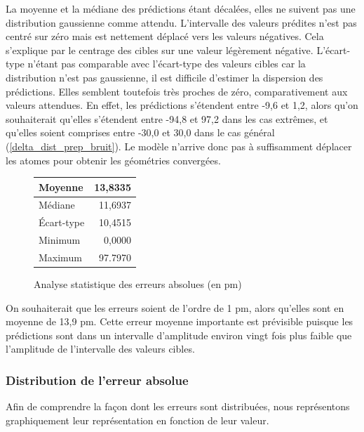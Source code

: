 \par La moyenne et la médiane des prédictions étant décalées, elles ne suivent pas une distribution gaussienne comme attendu. L'intervalle des valeurs prédites n'est pas centré sur zéro mais est nettement déplacé vers les valeurs négatives. Cela s'explique par le centrage des cibles sur une valeur légèrement négative.
L'écart-type n'étant pas comparable avec l'écart-type des valeurs cibles car la distribution n'est pas gaussienne, il est difficile d'estimer la dispersion des prédictions. Elles semblent toutefois très proches de zéro, comparativement aux valeurs attendues. En effet, les prédictions s'étendent entre -9,6 et 1,2, alors qu'on souhaiterait qu'elles s'étendent entre -94,8 et 97,2 dans les cas extrêmes, et qu'elles soient comprises entre -30,0 et 30,0 dans le cas général (\ref{delta_dist_prep_bruit}). Le modèle  n'arrive donc pas à suffisamment déplacer les atomes pour obtenir les géométries convergées.\\


\begin{figure}
	\centering
	\begin{tabular}{|l|r|}
		\hline
		Moyenne & 13,8335 \\ \hline
		Médiane & 11,6937 \\ \hline
		Écart-type & 10,4515 \\ \hline
		Minimum & 0,0000 \\ \hline
		Maximum & 97.7970 \\ \hline
	\end{tabular}
	
	\caption{Analyse statistique des erreurs absolues (en pm)}
	\label{t_stats_delta_dist_errs}

\end{figure}

\par On souhaiterait que les erreurs soient de l'ordre de 1 pm, alors qu'elles sont en moyenne de 13,9 pm. Cette erreur moyenne importante est prévisible puisque les prédictions sont dans un intervalle d'amplitude environ vingt fois plus faible que l'amplitude de l'intervalle des valeurs cibles.\\

\subsubsection{Distribution de l'erreur absolue}

Afin de comprendre la façon dont les erreurs sont distribuées, nous représentons graphiquement leur représentation en fonction de leur valeur.

